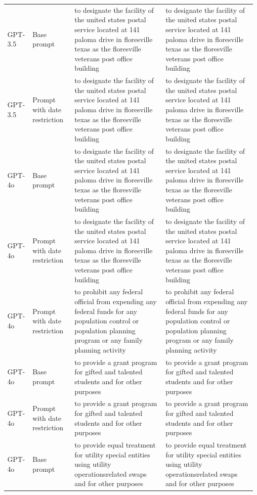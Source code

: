 \begin{longtable}{>{\raggedright\arraybackslash}p{1.4cm}>{\raggedright\arraybackslash}p{1.4cm}>{\raggedright\arraybackslash}p{5.5cm}>{\raggedright\arraybackslash}p{5.5cm}}
GPT-3.5 & Base prompt & to designate the facility of the united states postal service located at 141 paloma drive in floresville texas as the floresville veterans post office building & to designate the facility of the united states postal service located at 141 paloma drive in floresville texas as the floresville veterans post office building\\
GPT-3.5 & Prompt with date restriction & to designate the facility of the united states postal service located at 141 paloma drive in floresville texas as the floresville veterans post office building & to designate the facility of the united states postal service located at 141 paloma drive in floresville texas as the floresville veterans post office building\\
GPT-4o & Base prompt & to designate the facility of the united states postal service located at 141 paloma drive in floresville texas as the floresville veterans post office building & to designate the facility of the united states postal service located at 141 paloma drive in floresville texas as the floresville veterans post office building\\
GPT-4o & Prompt with date restriction & to designate the facility of the united states postal service located at 141 paloma drive in floresville texas as the floresville veterans post office building & to designate the facility of the united states postal service located at 141 paloma drive in floresville texas as the floresville veterans post office building\\
GPT-4o & Prompt with date restriction & to prohibit any federal official from expending any federal funds for any population control or population planning program or any family planning activity & to prohibit any federal official from expending any federal funds for any population control or population planning program or any family planning activity\\
GPT-4o & Base prompt & to provide a grant program for gifted and talented students and for other purposes & to provide a grant program for gifted and talented students and for other purposes\\
GPT-4o & Prompt with date restriction & to provide a grant program for gifted and talented students and for other purposes & to provide a grant program for gifted and talented students and for other purposes\\
GPT-4o & Base prompt & to provide equal treatment for utility special entities using utility operationsrelated swaps and for other purposes & to provide equal treatment for utility special entities using utility operationsrelated swaps and for other purposes\\

\end{longtable}
